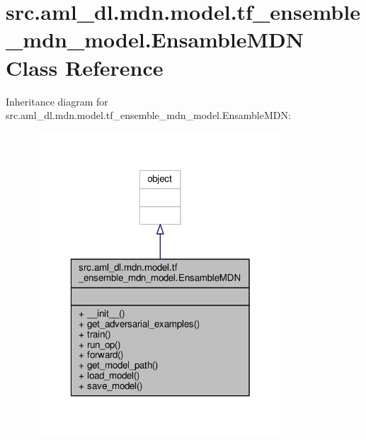 \hypertarget{classsrc_1_1aml__dl_1_1mdn_1_1model_1_1tf__ensemble__mdn__model_1_1_ensamble_m_d_n}{\section{src.\-aml\-\_\-dl.\-mdn.\-model.\-tf\-\_\-ensemble\-\_\-mdn\-\_\-model.\-Ensamble\-M\-D\-N Class Reference}
\label{classsrc_1_1aml__dl_1_1mdn_1_1model_1_1tf__ensemble__mdn__model_1_1_ensamble_m_d_n}
}


Inheritance diagram for src.\-aml\-\_\-dl.\-mdn.\-model.\-tf\-\_\-ensemble\-\_\-mdn\-\_\-model.\-Ensamble\-M\-D\-N\-:
\nopagebreak
\begin{figure}[H]
\begin{center}
\leavevmode
\includegraphics[width=268pt]{classsrc_1_1aml__dl_1_1mdn_1_1model_1_1tf__ensemble__mdn__model_1_1_ensamble_m_d_n__inherit__graph}
\end{center}
\end{figure}


